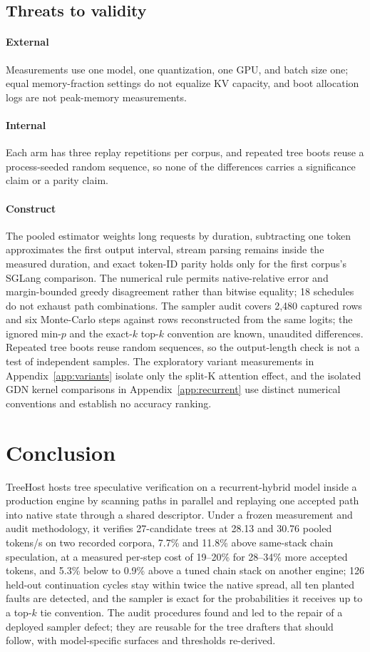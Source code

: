 \documentclass[sigconf,anonymous,review]{acmart}
\newcommand{\sys}{TreeHost}
\begin{document}
\subsection{Threats to validity}
\label{sec:limitations}
\paragraph{External} Measurements use one model, one quantization, one GPU, and batch size one; equal memory-fraction settings do not equalize KV capacity, and boot allocation logs are not peak-memory measurements. \paragraph{Internal} Each arm has three replay repetitions per corpus, and repeated tree boots reuse a process-seeded random sequence, so none of the differences carries a significance claim or a parity claim. \paragraph{Construct} The pooled estimator weights long requests by duration, subtracting one token approximates the first output interval, stream parsing remains inside the measured duration, and exact token-ID parity holds only for the first corpus's SGLang comparison. The numerical rule permits native-relative error and margin-bounded greedy disagreement rather than bitwise equality; 18 schedules do not exhaust path combinations. The sampler audit covers 2,480 captured rows and six Monte-Carlo steps against rows reconstructed from the same logits; the ignored min-$p$ and the exact-$k$ top-$k$ convention are known, unaudited differences. Repeated tree boots reuse random sequences, so the output-length check is not a test of independent samples. The exploratory variant measurements in Appendix~\ref{app:variants} isolate only the split-K attention effect, and the isolated GDN kernel comparisons in Appendix~\ref{app:recurrent} use distinct numerical conventions and establish no accuracy ranking.

\section{Conclusion}
\sys{} hosts tree speculative verification on a recurrent-hybrid model inside a production engine by scanning paths in parallel and replaying one accepted path into native state through a shared descriptor. Under a frozen measurement and audit methodology, it verifies 27-candidate trees at 28.13 and 30.76 pooled tokens/s on two recorded corpora, 7.7\% and 11.8\% above same-stack chain speculation, at a measured per-step cost of 19--20\% for 28--34\% more accepted tokens, and 5.3\% below to 0.9\% above a tuned chain stack on another engine; 126 held-out continuation cycles stay within twice the native spread, all ten planted faults are detected, and the sampler is exact for the probabilities it receives up to a top-$k$ tie convention. The audit procedures found and led to the repair of a deployed sampler defect; they are reusable for the tree drafters that should follow, with model-specific surfaces and thresholds re-derived.
\end{document}
